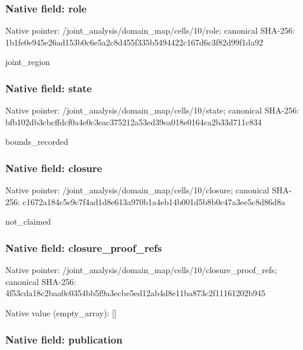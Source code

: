 \documentclass[10pt,a4paper]{article}
\begin{document}
\subsubsection{Native field: role}


Native pointer: /joint\_analysis/domain\_m\allowbreak{}ap/cells/10/role; canonical SHA-256: 1b1fe0e945e26ad153b0c6e5\allowbreak{}a2c8d455f335b5494422c167\allowbreak{}d6c3f82d99f1da92


joint\_region


\subsubsection{Native field: state}


Native pointer: /joint\_analysis/domain\_m\allowbreak{}ap/cells/10/state; canonical SHA-256: bfb102db3cbcffdcf0a4e0c3\allowbreak{}eac375212a53ed39ea018e01\allowbreak{}64ca2b33d711c834


bounds\_recorded


\subsubsection{Native field: closure}


Native pointer: /joint\_analysis/domain\_m\allowbreak{}ap/cells/10/closure; canonical SHA-256: c1672a184c5e9c7f4ad1d8e6\allowbreak{}13a970b1a4eb14b001d5b8b0\allowbreak{}c47a3ee5c8d86d8a


not\_claimed


\subsubsection{Native field: closure\_proof\_refs}


Native pointer: /joint\_analysis/domain\_m\allowbreak{}ap/cells/10/closure\_proo\allowbreak{}f\_refs; canonical SHA-256: 4f53cda18c2baa0c0354bb5f\allowbreak{}9a3ecbe5ed12ab4d8e11ba87\allowbreak{}3c2f11161202b945



Native value (empty\_array): []



\subsubsection{Native field: publication}
\end{document}
